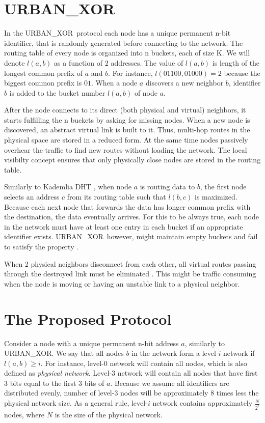 \documentclass[14pt]{extarticle}
\newcommand{\urbanxor}{URBAN\_XOR}
\begin{document}
\section{\urbanxor}

In the \urbanxor\ protocol each node has a unique permanent n-bit identifier, that is randomly generated before connecting to the network. The routing table of every node is organized into n buckets, each of size K. We will denote $l(a,b)$ as a function of 2 addresses. The value of $l(a,b)$ is length of the longest common prefix of $a$ and $b$. For instance, $l(01100, 01000) = 2$ because the biggest common prefix is $01$. When a node $a$ discovers a new neighbor $b$, identifier $b$ is added to the bucket number $l(a,b)$ of node $a$.

After the node connects to its direct (both physical and virtual) neighbors, it starts fulfilling the n buckets by asking for missing nodes. When a new node is discovered, an abstract virtual link is built to it. Thus, multi-hop routes in the physical space are stored in a reduced form. At the same time nodes passively overhear the traffic to find new routes without loading the network. The local visibilty concept ensures that only physically close nodes are stored in the routing table.

Similarly to Kademlia DHT \cite{kademlia}, when node $a$ is routing data to $b$, the first node selects an address $c$ from its routing table such that $l(b,c)$ is maximized. Because each next node that forwards the data has longer common prefix with the destination, the data eventually arrives. For this to be always true, each node in the network must have at least one entry in each bucket if an appropriate identifier exists. \urbanxor\, however, might maintain empty buckets and fail to satisfy the property \cite{Pasquini}.

When 2 physical neighbors disconnect from each other, all virtual routes passing through the destroyed link must be eliminated \cite{Pasquini}. This might be traffic consuming when the node is moving or having an unstable link to a physical neighbor.

\section{The Proposed Protocol}

Consider a node with a unique permanent n-bit address $a$, similarly to \urbanxor. We say that all nodes $b$ in the network form a level-$i$ network if $l(a,b) \ge i$. For instance, level-0 network will contain all nodes, which is also defined as \emph{physical network}. Level-3 network will contain all nodes that have first 3 bits equal to the first 3 bits of $a$. Because we assume all identifiers are distributed evenly, number of level-3 nodes will be approximately 8 times less the physical network size. As a general rule, level-$i$ network contains approximately $\frac{N}{2^i}$ nodes, where $N$ is the size of the physical network.
\end{document}
